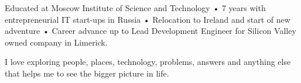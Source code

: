 

\begin{cvparagraph}

Educated at Moscow Institute of Science and Technology • 7 years with entrepreneurial IT start-ups in Russia • Relocation to Ireland and start of new adventure • Career advance up to Lead Development Engineer for Silicon Valley owned company in Limerick.

I love exploring people, places, technology, problems, answers and anything else that helps me to see the bigger picture in life.

\end{cvparagraph}
